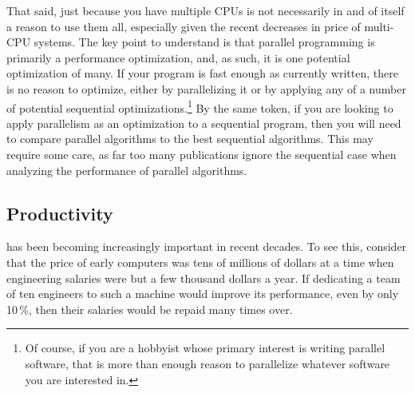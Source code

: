 That said, just because you have multiple CPUs is not necessarily
in and of itself a reason to use them all, especially given the
recent decreases in price of multi-CPU systems.
The key point to understand is that parallel programming is primarily
a performance optimization, and, as such, it is one potential optimization
of many.
If your program is fast enough as currently written, there is no
reason to optimize, either by parallelizing it or by applying any
of a number of potential sequential optimizations.\footnote{
	Of course, if you are a hobbyist whose primary interest is
	writing parallel software, that is more than enough reason to
	parallelize whatever software you are interested in.}
By the same token, if you are looking to apply parallelism as an
optimization to a sequential program, then you will need to compare
parallel algorithms to the best sequential algorithms.
This may require some care, as far too many publications ignore the
sequential case when analyzing the performance of parallel algorithms.

\subsection{Productivity}
\label{sec:intro:Productivity}

\QuickQuizEnd

 has been becoming increasingly important in recent decades.
To see this, consider that the price of early computers was tens
of millions of dollars at
a time when engineering salaries were but a few thousand dollars a year.
If dedicating a team of ten engineers to such a machine would improve
its performance, even by only 10\,\%, then their salaries
would be repaid many times over.

